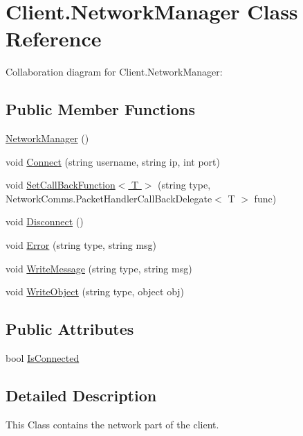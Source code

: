 \hypertarget{class_client_1_1_network_manager}{}\section{Client.\+Network\+Manager Class Reference}
\label{class_client_1_1_network_manager}


Collaboration diagram for Client.\+Network\+Manager\+:
\subsection*{Public Member Functions}
\begin{DoxyCompactItemize}
\item 
\hyperlink{class_client_1_1_network_manager_aecfff361611fa23b314522f9096d650b}{Network\+Manager} ()
\item 
void \hyperlink{class_client_1_1_network_manager_af288b5cc868c0eb586b67d9155650cd4}{Connect} (string username, string ip, int port)
\item 
void \hyperlink{class_client_1_1_network_manager_a153ce2acab6ca7ae2a16177603318328}{Set\+Call\+Back\+Function$<$ T $>$} (string type, Network\+Comms.\+Packet\+Handler\+Call\+Back\+Delegate$<$ T $>$ func)
\item 
void \hyperlink{class_client_1_1_network_manager_a488b3fc53182cc8d8da731a6a66d7156}{Disconnect} ()
\item 
void \hyperlink{class_client_1_1_network_manager_ac1e0ad62226df6e63b02d0680fe9a8ca}{Error} (string type, string msg)
\item 
void \hyperlink{class_client_1_1_network_manager_ab07955561eb46316ddf2c1e3f4d72670}{Write\+Message} (string type, string msg)
\item 
void \hyperlink{class_client_1_1_network_manager_a94eba16a4e3153c3676982aa4fec97c8}{Write\+Object} (string type, object obj)
\end{DoxyCompactItemize}
\subsection*{Public Attributes}
\begin{DoxyCompactItemize}
\item 
bool \hyperlink{class_client_1_1_network_manager_a4be8908e8a6e14e5ac6f8ceb783e54cb}{Is\+Connected}
\end{DoxyCompactItemize}


\subsection{Detailed Description}
This Class contains the network part of the client. 

